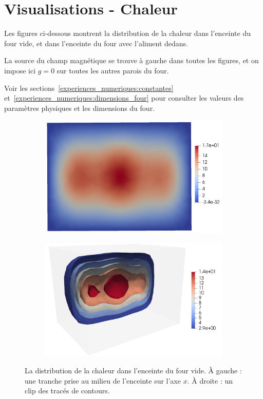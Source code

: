 \section{Visualisations - Chaleur}

Les figures ci-dessous montrent la distribution de la chaleur dans
l'enceinte du four vide, et dans l'enceinte du four avec l'aliment
dedans.

La source du champ magnétique se trouve à gauche dans toutes les
figures, et on impose ici $g = 0$ sur toutes les autres parois
du four.

Voir les sections~\ref{experiences_numeriques:constantes}
et~\ref{experiences_numeriques:dimensions_four} pour consulter
les valeurs des paramètres physiques et les dimensions du four.

\begin{figure}[H]
    \centering
    \begin{subfigure}{.5\textwidth}
        \centering
        \includegraphics[scale=0.15]{figures/chaleur/chaleur_vide1.png}
    \end{subfigure}%
    \begin{subfigure}{.5\textwidth}
        \centering
        \includegraphics[scale=0.15]{figures/chaleur/chaleur_vide2.png}
    \end{subfigure}
    \caption{La distribution de la chaleur dans l'enceinte du four vide.
    À gauche : une tranche prise au milieu de l'enceinte sur l'axe $x$.
    À droite : un clip des tracés de contours.}
\end{figure}

